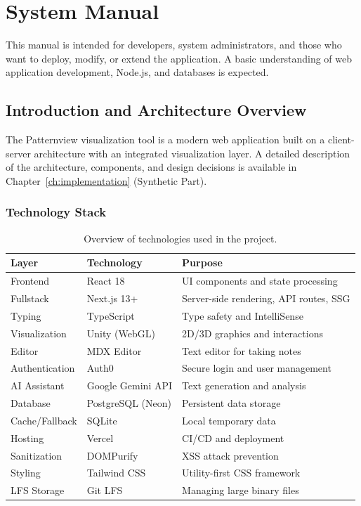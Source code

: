 
\chapter{System Manual}\label{app:system.manual}

This manual is intended for developers, system administrators, and those who want to deploy, modify, or extend the application. A basic understanding of web application development, Node.js, and databases is expected.

\section{Introduction and Architecture Overview}

The Patternview visualization tool is a modern web application built on a client-server architecture with an integrated visualization layer. A detailed description of the architecture, components, and design decisions is available in Chapter~\ref{ch:implementation} (Synthetic Part).

\subsection{Technology Stack}

\begin{table}[h]
  \centering
  \caption{Overview of technologies used in the project.}
  \label{tab:tech_stack}
  \renewcommand{\arraystretch}{1.2}
  \begin{tabular}{|l|l|p{}|}
    \hline
    \textbf{Layer} & \textbf{Technology} & \textbf{Purpose} \\ \hline
    Frontend & React 18 & UI components and state processing \\ \hline
    Fullstack & Next.js 13+ & Server-side rendering, API routes, SSG \\ \hline
    Typing & TypeScript & Type safety and IntelliSense \\ \hline
    Visualization & Unity (WebGL) & 2D/3D graphics and interactions \\ \hline
    Editor & MDX Editor & Text editor for taking notes \\ \hline
    Authentication & Auth0 & Secure login and user management \\ \hline
    AI Assistant & Google Gemini API & Text generation and analysis \\ \hline
    Database & PostgreSQL (Neon) & Persistent data storage \\ \hline
    Cache/Fallback & SQLite & Local temporary data \\ \hline
    Hosting & Vercel & CI/CD and deployment \\ \hline
    Sanitization & DOMPurify & XSS attack prevention \\ \hline
    Styling & Tailwind CSS & Utility-first CSS framework \\ \hline
    LFS Storage & Git LFS & Managing large binary files \\ \hline
  \end{tabular}
\end{table}

